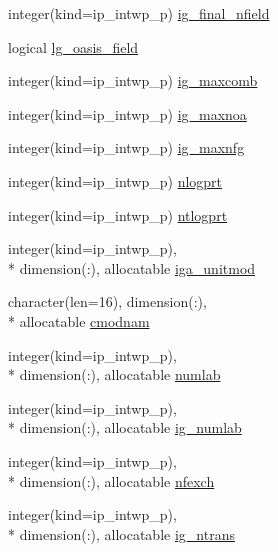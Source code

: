 \begin{DoxyCompactItemize}
\item 
integer(kind=ip\+\_\+intwp\+\_\+p) \hyperlink{classmod__oasis__namcouple_a7cf04d6fb678ee65b7fbedc56a0d680a}{ig\+\_\+final\+\_\+nfield}
\item 
logical \hyperlink{classmod__oasis__namcouple_aaf6b923ffc7763fd37a5c4c72bdfa34d}{lg\+\_\+oasis\+\_\+field}
\item 
integer(kind=ip\+\_\+intwp\+\_\+p) \hyperlink{classmod__oasis__namcouple_abba00866a740567bc1d93cf5850042fd}{ig\+\_\+maxcomb}
\item 
integer(kind=ip\+\_\+intwp\+\_\+p) \hyperlink{classmod__oasis__namcouple_ae66cf9f63b6c440406c9b675caef7759}{ig\+\_\+maxnoa}
\item 
integer(kind=ip\+\_\+intwp\+\_\+p) \hyperlink{classmod__oasis__namcouple_aab2d4bcc2dc767df51f99f907f4f3e6e}{ig\+\_\+maxnfg}
\item 
integer(kind=ip\+\_\+intwp\+\_\+p) \hyperlink{classmod__oasis__namcouple_a7b8c924fdea622759b99d8f61e03ade5}{nlogprt}
\item 
integer(kind=ip\+\_\+intwp\+\_\+p) \hyperlink{classmod__oasis__namcouple_a49bd874b06648257f7ce70da19a678b4}{ntlogprt}
\item 
integer(kind=ip\+\_\+intwp\+\_\+p), \\*
dimension(\+:), allocatable \hyperlink{classmod__oasis__namcouple_adb532de2f5268d0e40ae162999dbe2ff}{iga\+\_\+unitmod}
\item 
character(len=16), dimension(\+:), \\*
allocatable \hyperlink{classmod__oasis__namcouple_af655140b07f24b508df7244f8103c670}{cmodnam}
\item 
integer(kind=ip\+\_\+intwp\+\_\+p), \\*
dimension(\+:), allocatable \hyperlink{classmod__oasis__namcouple_a12e1621f5697a0cdbde11d3e25f43b54}{numlab}
\item 
integer(kind=ip\+\_\+intwp\+\_\+p), \\*
dimension(\+:), allocatable \hyperlink{classmod__oasis__namcouple_ab0b9a7822ec44010e8652ed2d6abc0db}{ig\+\_\+numlab}
\item 
integer(kind=ip\+\_\+intwp\+\_\+p), \\*
dimension(\+:), allocatable \hyperlink{classmod__oasis__namcouple_ac6216c78a2779e49f90a9a95a39c27d7}{nfexch}
\item 
integer(kind=ip\+\_\+intwp\+\_\+p), \\*
dimension(\+:), allocatable \hyperlink{classmod__oasis__namcouple_ac4549f9f5bbb37fce3edc9a208e0d48b}{ig\+\_\+ntrans}

\end{DoxyCompactItemize}
